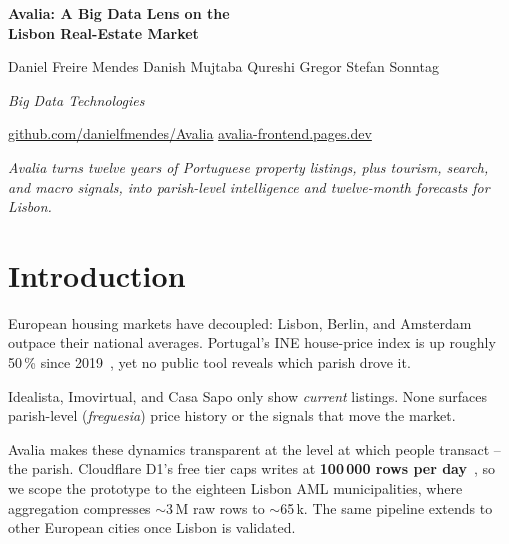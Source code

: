 \documentclass[11pt,a4paper]{article}
\begin{document}
\begin{titlepage}
\centering
\vspace*{4cm}
{\Huge\bfseries Avalia: A Big Data Lens on the\\[6pt] Lisbon Real-Estate Market\par}
\vspace{1.6cm}
{\large Daniel Freire Mendes \quad Danish Mujtaba Qureshi \quad Gregor Stefan Sonntag\par}
\vspace{0.6cm}
{\itshape Big Data Technologies\par}
\vspace{0.5cm}
\href{https://github.com/danielfmendes/Avalia}{github.com/danielfmendes/Avalia} \quad
\href{https://avalia-frontend.pages.dev}{avalia-frontend.pages.dev}\par
\vspace{2.2cm}
\begin{minipage}{0.82\linewidth}
\centering\itshape
Avalia turns twelve years of Portuguese property listings, plus tourism, search, and macro signals, into parish-level intelligence and twelve-month forecasts for Lisbon.
\end{minipage}
\vfill
\end{titlepage}

\setcounter{tocdepth}{1}
{\hypersetup{linkcolor=black}\tableofcontents}
\clearpage

\section{Introduction}\label{sec:intro}

European housing markets have decoupled: Lisbon, Berlin, and Amsterdam outpace their national averages. Portugal's INE house-price index is up roughly 50\,\% since 2019~\parencite{INE}, yet no public tool reveals which parish drove it.

Idealista, Imovirtual, and Casa Sapo only show \emph{current} listings. None surfaces parish-level (\emph{freguesia}) price history or the signals that move the market.

Avalia makes these dynamics transparent at the level at which people transact -- the parish. Cloudflare D1's free tier caps writes at \textbf{100\,000 rows per day}~\parencite{cloudflareD1}, so we scope the prototype to the eighteen Lisbon AML municipalities, where aggregation compresses $\sim$3\,M raw rows to $\sim$65\,k. The same pipeline extends to other European cities once Lisbon is validated.
\end{document}
